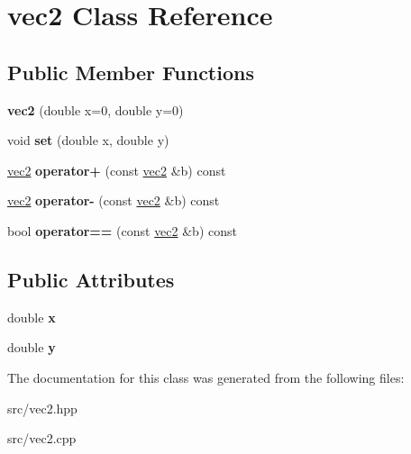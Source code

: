 \hypertarget{classvec2}{\section{vec2 Class Reference}
\label{classvec2}
}
\subsection*{Public Member Functions}
\begin{DoxyCompactItemize}
\item 
\hypertarget{classvec2_add5c0b4c7cf081d3292788a452cb489a}{{\bfseries vec2} (double x=0, double y=0)}\label{classvec2_add5c0b4c7cf081d3292788a452cb489a}

\item 
\hypertarget{classvec2_aedc685aecce22ebb9832a0dfa9ba4e76}{void {\bfseries set} (double x, double y)}\label{classvec2_aedc685aecce22ebb9832a0dfa9ba4e76}

\item 
\hypertarget{classvec2_a6e4d7583e07fd84b3314896e2f49f9c0}{\hyperlink{classvec2}{vec2} {\bfseries operator+} (const \hyperlink{classvec2}{vec2} \&b) const }\label{classvec2_a6e4d7583e07fd84b3314896e2f49f9c0}

\item 
\hypertarget{classvec2_afb69e05f24446157113eebf78b8fa64b}{\hyperlink{classvec2}{vec2} {\bfseries operator-\/} (const \hyperlink{classvec2}{vec2} \&b) const }\label{classvec2_afb69e05f24446157113eebf78b8fa64b}

\item 
\hypertarget{classvec2_aa9aacd2fc0ad8e81efe83e9f02b21749}{bool {\bfseries operator==} (const \hyperlink{classvec2}{vec2} \&b) const }\label{classvec2_aa9aacd2fc0ad8e81efe83e9f02b21749}

\end{DoxyCompactItemize}
\subsection*{Public Attributes}
\begin{DoxyCompactItemize}
\item 
\hypertarget{classvec2_ac38b8dcc3bc5eb2b4fb6971638af64d1}{double {\bfseries x}}\label{classvec2_ac38b8dcc3bc5eb2b4fb6971638af64d1}

\item 
\hypertarget{classvec2_a77fcc56ac7af5cee53b8ca789dacac1f}{double {\bfseries y}}\label{classvec2_a77fcc56ac7af5cee53b8ca789dacac1f}

\end{DoxyCompactItemize}


The documentation for this class was generated from the following files\-:\begin{DoxyCompactItemize}
\item 
src/vec2.\-hpp\item 
src/vec2.\-cpp\end{DoxyCompactItemize}
